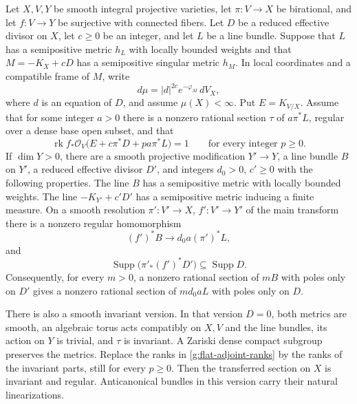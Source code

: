 \begin{proposition}
\label{g:reduced-flat-transfer}
Let \(X,V,Y\) be smooth integral projective varieties, let
\(\pi:V\to X\) be birational, and let \(f:V\to Y\) be surjective with
connected fibers.  Let \(D\) be a reduced effective divisor on \(X\),
let \(c\ge0\) be an integer, and let \(L\) be a line bundle.
Suppose that \(L\) has a semipositive metric \(h_L\) with locally bounded
weights and that \(M=-K_X+cD\) has a semipositive singular metric
\(h_M\).  In local coordinates and a compatible frame of \(M\), write
\[
              d\mu=|d|^{2c}e^{-\varphi_M}\,dV_X,
\]
where \(d\) is an equation of \(D\), and assume \(\mu(X)<\infty\).
Put \(E=K_{V/X}\).  Assume that for some integer \(a>0\) there is a
nonzero rational section \(\tau\) of \(a\pi^*L\), regular over a dense
base open subset, and that
\begin{equation}
 \operatorname{rk} f_*\mathcal O_V\bigl(E+c\pi^*D+pa\pi^*L\bigr)=1
                \qquad\text{for every integer }p\ge0.
 \label{g:flat-adjoint-ranks}
\end{equation}
If \(\dim Y>0\), there are a smooth projective modification
\(Y'\to Y\), a line bundle \(B\) on \(Y'\), a reduced effective divisor
\(D'\), and integers \(d_0>0\), \(c'\ge0\) with the following properties.
The line \(B\) has a semipositive metric with locally bounded weights.
The line \(-K_{Y'}+c'D'\) has a semipositive metric inducing a finite
measure.  On a smooth resolution
\(\pi':V'\to X\), \(f':V'\to Y'\) of the main transform there is a
nonzero regular homomorphism
\begin{equation}
                  (f')^*B\longrightarrow d_0a(\pi')^*L,
 \label{g:flat-output-map}
\end{equation}
and
\begin{equation}
       \operatorname{Supp}\bigl(\pi'_* (f')^*D'\bigr)
                            \subseteq\operatorname{Supp}D.
 \label{g:flat-pole-support}
\end{equation}
Consequently, for every \(m>0\), a nonzero rational section of \(mB\)
with poles only on \(D'\) gives a nonzero rational section of
\(md_0aL\) with poles only on \(D\).

There is also a smooth invariant version.  In that version \(D=0\),
both metrics are smooth, an algebraic torus acts compatibly on \(X,V\)
and the line bundles, its action on \(Y\) is trivial, and \(\tau\) is
invariant.  A Zariski dense compact subgroup preserves the metrics.
Replace the ranks in \eqref{g:flat-adjoint-ranks} by the ranks of the
invariant parts, still for every \(p\ge0\).  Then the transferred section
on \(X\) is invariant and regular.  Anticanonical bundles in this version
carry their natural linearizations.
\end{proposition}

